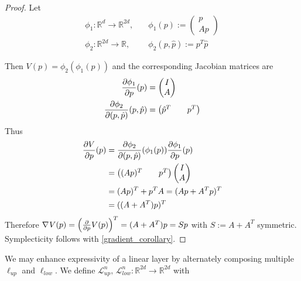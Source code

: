 \documentclass[twoside,a4paper]{article}
\begin{document}
\begin{proof}
	Let
	\begin{align*}
		\phi_1: \mathbb{R}^d \to \mathbb{R}^{2d}, \quad &\phi_1(p) := \begin{pmatrix}
			p \\
			Ap
		\end{pmatrix} \\
		\phi_2: \mathbb{R}^{2d} \to \mathbb{R}, \quad &\phi_2(p, \hat{p}) := 
		p^T\hat{p}
	\end{align*}
	
	Then $V(p) = \phi_2(\phi_1(p))$ and the corresponding Jacobian matrices are
	\begin{align*}
		\frac{\partial \phi_1}{\partial p}(p) &= \begin{pmatrix}
			I \\
			A
		\end{pmatrix} \\
		\frac{\partial \phi_2}{\partial (p,\hat{p})}(p, \hat{p}) &= \begin{pmatrix}
			\hat{p}^T && p^T
		\end{pmatrix}
	\end{align*}
	Thus
	\begin{align*}
		\frac{\partial V}{\partial p}(p) &= 
		\frac{\partial \phi_2}{\partial (p,\hat{p})} (\phi_1(p))
		\frac{\partial \phi_1}{\partial p}(p) \\
		&= \begin{pmatrix}
			(Ap)^T && p^T
		\end{pmatrix}
		\begin{pmatrix}
			I \\
			A
		\end{pmatrix} \\
		&= (Ap)^T + p^TA = (Ap + A^Tp)^T \\
		&= ((A+A^T)p)^T
	\end{align*}
	Therefore $\nabla_{}{V}(p) = \left( \frac{\partial }{\partial p}V(p) \right)^T = (A+A^T)p = Sp$ with
	$S := A+A^T$ symmetric. Symplecticity follows with \cref{gradient_corollary}.
\end{proof}

We may enhance expressivity of a linear layer by alternately composing multiple
$\ell_{up}$ and $\ell_{low}$. We define 
$\mathcal{L}^{n}_{up},\, \mathcal{L}^{n}_{low} : \mathbb{R}^{2d} \to \mathbb{R}^{2d}$ with
\end{document}
